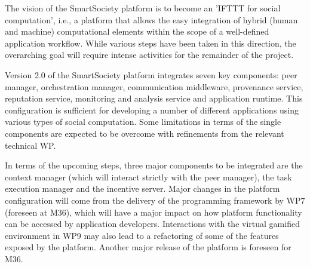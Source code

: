 The vision of the SmartSociety platform is to become an 'IFTTT for social computation', i.e., a platform that allows the easy integration of hybrid (human and machine) computational elements within the scope of a well-defined application workflow. While various steps have been taken in this direction, the overarching goal will require intense activities for the remainder of the project. 

Version 2.0 of the SmartSociety platform integrates seven key components: peer manager, orchestration manager, communication middleware, provenance service, reputation service, monitoring and analysis service and application runtime. This configuration is sufficient for developing a number of different applications using various types of social computation. Some limitations in terms of the single components are expected to be overcome with refinements from the relevant technical WP.

In terms of the upcoming steps, three major components to be integrated are the context manager (which will interact strictly with the peer manager), the task execution manager and the incentive server. Major changes in the platform configuration will come from the delivery of the programming framework by WP7 (foreseen at M36), which will have a major impact on how platform functionality can be accessed by application developers. Interactions with the virtual gamified environment in WP9 may also lead to a refactoring of some of the features exposed by the platform. Another major release of the platform is foreseen for M36. 


